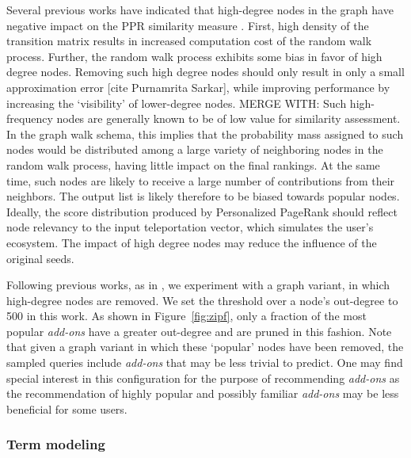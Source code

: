\documentclass[11pt,oneside]{book}
\let\Oldsubsubsection\subsubsection
\renewcommand{\subsubsection}{\FloatBarrier\Oldsubsubsection}
\begin{document}
Several previous works have indicated that high-degree nodes in the graph have negative impact on the PPR similarity measure \citep{tong2006center}. First, high density of the transition matrix results in increased computation cost of the random walk process. Further, the random walk process exhibits some bias in favor of high degree nodes. Removing such high degree nodes should only result in only a small approximation error [cite Purnamrita Sarkar], while improving performance by increasing the `visibility' of lower-degree nodes. MERGE WITH: Such high-frequency nodes are generally known to be of low value for similarity assessment. In the graph walk schema, this implies that the probability mass assigned to such nodes would be distributed among a large variety of neighboring nodes in the random walk process, having little impact on the final rankings. At the same time, such nodes are likely to receive a large number of contributions from their neighbors. The output list is likely therefore to be biased towards popular nodes. Ideally, the score distribution produced by Personalized PageRank should reflect node relevancy to the input teleportation vector, which simulates the user's ecosystem. The impact of high degree nodes may reduce the influence of the original seeds.

Following previous works, as in \citep{sarkar2010fast},
we experiment with a graph variant, in which high-degree nodes are
removed. We set the threshold over a node's out-degree to 500 in this
work. As shown in Figure~\ref{fig:zipf}, only a fraction of the most popular {\it add-ons} have a greater out-degree and are pruned in this fashion. Note that given a graph variant in which these `popular' nodes have been removed, the sampled queries include {\it add-ons} that may be less trivial to predict. One may find special interest in this configuration for the purpose of recommending {\it add-ons} as the recommendation of highly popular and possibly familiar {\it add-ons} may be less beneficial for some users. 

\subsubsection{Term modeling}
\end{document}
